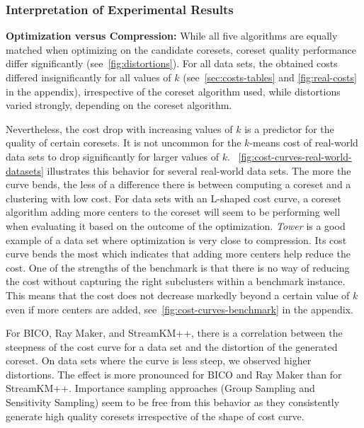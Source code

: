 

\subsubsection*{Interpretation of Experimental Results}



{\bf Optimization versus Compression:}
While all five algorithms are equally matched when optimizing on the candidate coresets, coreset quality performance differ significantly (see~\cref{fig:distortions}). 
For all data sets, the obtained costs differed insignificantly for all values of $k$ (see~\cref{sec:costs-tables} and \cref{fig:real-costs} in the appendix), irrespective of the coreset algorithm used, while distortions varied strongly, depending on the coreset algorithm.

Nevertheless, the cost drop with increasing values of $k$ is a predictor for the quality of certain coresets. It is not uncommon for the $k$-means cost of real-world data sets to drop significantly for larger values of $k$.
~\cref{fig:cost-curves-real-world-datasets} illustrates this behavior for several real-world data sets. The more the curve bends, the less of a difference there is between computing a coreset and a clustering with low cost. For data sets with an L-shaped cost curve, a coreset algorithm adding more centers to the coreset will seem to be performing well when evaluating it based on the outcome of the optimization.
\textit{Tower} is a good example of a data set where optimization is very close to compression. Its cost curve bends the most which indicates that adding more centers help reduce the cost. One of the strengths of the benchmark is that there is no way of reducing the cost without capturing the right subclusters within a benchmark instance. This means that the cost does not decrease markedly beyond a certain value of $k$ even if more centers are added, see~\cref{fig:cost-curves-benchmark} in the appendix. 

For BICO, Ray Maker, and StreamKM++, there is a correlation between the steepness of the cost curve for a data set and the distortion of the generated coreset. 
On data sets where the curve is less steep, we observed higher distortions. The effect is more pronounced for BICO and Ray Maker than for StreamKM++. Importance sampling approaches (Group Sampling and Sensitivity Sampling) seem to be free from this behavior as they consistently generate high quality coresets irrespective of the shape of cost curve.







